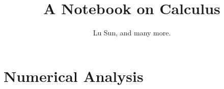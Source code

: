 



\makeindex



\frontmatter

\title{A Notebook on Calculus}
\author{Lu Sun, and many more.}

\maketitle


\tableofcontents


\listoffigures
\listoftables

\mainmatter



















\part{Numerical Analysis}








\printindex


